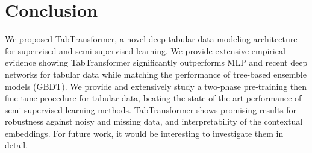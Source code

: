 \section{Conclusion}
We proposed TabTransformer, a novel deep tabular data modeling architecture for supervised and semi-supervised learning. We provide extensive empirical evidence showing TabTransformer significantly outperforms MLP and recent deep networks for tabular data while matching the performance of tree-based ensemble models (GBDT). 
We provide and extensively study a two-phase pre-training then fine-tune procedure for tabular data, beating the state-of-the-art performance of semi-supervised learning methods.
TabTransformer shows promising results for robustness against noisy and missing data, and interpretability of the contextual embeddings. For future work, it would be interesting to investigate them in detail. 

\newpage
\clearpage
\begin{quote}
\begin{small}
\end{small}
\end{quote}

\newpage
\clearpage

\newpage
\clearpage

